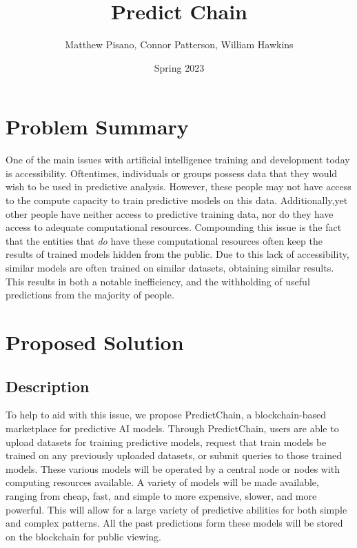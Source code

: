 \documentclass{article}
\title{Predict Chain}
\author{Matthew Pisano, Connor Patterson, William Hawkins}
\date{Spring 2023}
\begin{document}
    \maketitle

    \section{Problem Summary}

    One of the main issues with artificial intelligence training and development today is accessibility. Oftentimes,
    individuals or groups possess data that they would wish to be used in predictive analysis. However, these people
    may not have access to the compute capacity to train predictive models on this data.  Additionally,yet other
    people have neither access to predictive training data, nor do they have access to adequate computational resources.
    Compounding this issue is the fact that the entities that \textit{do} have these computational resources often keep the results of
    trained models hidden from the public.  Due to this lack of accessibility, similar models are often trained on similar datasets,
    obtaining similar results.  This results in both a notable inefficiency, and the withholding of useful predictions from
    the majority of people.

    \section{Proposed Solution}

    \subsection{Description}

    To help to aid with this issue, we propose PredictChain, a blockchain-based marketplace for predictive AI models.
    Through PredictChain, users are able to upload datasets for training predictive models, request that train models
    be trained on any previously uploaded datasets, or submit queries to those trained models.
    These various models will be operated by a central node or nodes with computing resources available. A variety of
    models will be made available, ranging from cheap, fast, and simple to more expensive, slower, and more powerful.
    This will allow for a large variety of predictive abilities for both simple and complex patterns.  All the past predictions
    form these models will be stored on the blockchain for public viewing.
\end{document}

